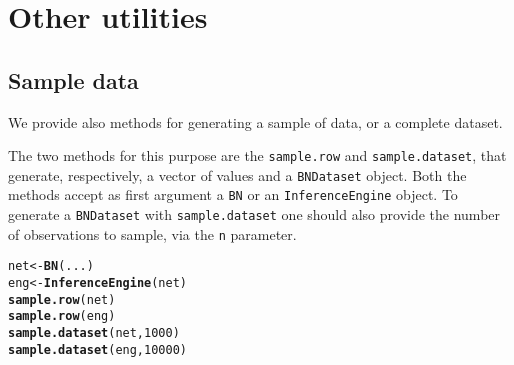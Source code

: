 \documentclass{article}\usepackage[]{graphicx}\usepackage[]{color}
\makeatletter
\newcommand{\hlnum}[1]{\textcolor[rgb]{0.686,0.059,0.569}{#1}}%
\newcommand{\hlstd}[1]{\textcolor[rgb]{0.345,0.345,0.345}{#1}}%
\newcommand{\hlkwb}[1]{\textcolor[rgb]{0.69,0.353,0.396}{#1}}%
\newcommand{\hlkwd}[1]{\textcolor[rgb]{0.737,0.353,0.396}{\textbf{#1}}}%
\newenvironment{kframe}{%
 \def\at@end@of@kframe{}%
 \ifinner\ifhmode%
  \def\at@end@of@kframe{\end{minipage}}%
  \begin{minipage}{\columnwidth}%
 \fi\fi%
 \def\FrameCommand##1{\hskip\@totalleftmargin \hskip-\fboxsep
 \colorbox{shadecolor}{##1}\hskip-\fboxsep
     \hskip-\linewidth \hskip-\@totalleftmargin \hskip\columnwidth}%
 \MakeFramed {\advance\hsize-\width
   \@totalleftmargin\z@ \linewidth\hsize
   \@setminipage}}%
 {\par\unskip\endMakeFramed%
 \at@end@of@kframe}
\newenvironment{knitrout}{}{} %
\newcommand{\Robject}[1]{{\texttt{#1}}}
\newcommand{\Rmethod}[1]{{\texttt{#1}}}
\newcommand{\Rfunarg}[1]{{\texttt{#1}}}
\makeatother
\begin{document}
\section{Other utilities}
\subsection{Sample data}
We provide also methods for generating a sample of data, or a complete dataset.

The two methods for this purpose are the \Rmethod{sample.row} and \Rmethod{sample.dataset}, that generate, respectively,
a vector of values and a \Robject{BNDataset} object. Both the methods accept as first argument a \Robject{BN} or an
\Robject{InferenceEngine} object. To generate a \Robject{BNDataset} with \Rmethod{sample.dataset} one should also provide the
number of observations to sample, via the \Rfunarg{n} parameter.

\begin{knitrout}
\color{fgcolor}\begin{kframe}
\begin{alltt}
\hlstd{net} \hlkwb{<-} \hlkwd{BN}\hlstd{(...)}
\hlstd{eng} \hlkwb{<-} \hlkwd{InferenceEngine}\hlstd{(net)}
\hlkwd{sample.row}\hlstd{(net)}
\hlkwd{sample.row}\hlstd{(eng)}
\hlkwd{sample.dataset}\hlstd{(net,}\hlnum{1000}\hlstd{)}
\hlkwd{sample.dataset}\hlstd{(eng,}\hlnum{10000}\hlstd{)}
\end{alltt}
\end{kframe}
\end{knitrout}




\end{document}
